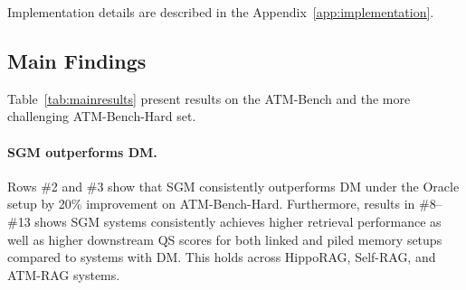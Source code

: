 \documentclass{article}
\theoremstyle{plain}
\theoremstyle{definition}
\theoremstyle{remark}
\begin{document}
Implementation details are described in the Appendix~\ref{app:implementation}. %



\subsection{Main Findings}
\label{sec:main_results}

Table~\ref{tab:mainresults} present results on the ATM-Bench and the more challenging ATM-Bench-Hard set. 


\paragraph{SGM outperforms DM.}

Rows \#2 and \#3 show that SGM consistently outperforms DM under the Oracle setup by 20\% improvement on ATM-Bench-Hard.
Furthermore, results in \#8–\#13 shows  SGM systems consistently achieves higher retrieval performance as well as higher downstream QS scores for both linked and piled memory setups compared to systems with DM. This holds across HippoRAG, Self-RAG, and ATM-RAG systems. %


\end{document}
